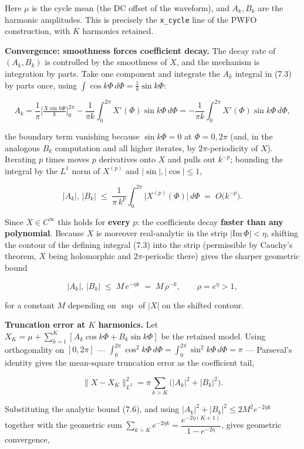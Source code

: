 \documentclass[
  11pt,
]{article}
\providecommand{\lt}{<}
\providecommand{\gt}{>}
\begin{document}
Here \(\mu\) is the cycle mean (the DC offset of the waveform), and
\(A_k,B_k\) are the harmonic amplitudes. This is precisely the
\texttt{x\_cycle} line of the PWFO construction, with \(K\) harmonics
retained.

\textbf{Convergence: smoothness forces coefficient decay.} The decay
rate of \((A_k,B_k)\) is controlled by the smoothness of \(X\), and the
mechanism is integration by parts. Take one component and integrate the
\(A_k\) integral in (7.3) by parts once, using
\(\int\cos k\Phi\,d\Phi=\tfrac{1}{k}\sin k\Phi\):

\[
A_k=\frac{1}{\pi}\Big[\tfrac{X\sin k\Phi}{k}\Big]_0^{2\pi}-\frac{1}{\pi k}\int_0^{2\pi} X'(\Phi)\sin k\Phi\,d\Phi
=-\frac{1}{\pi k}\int_0^{2\pi} X'(\Phi)\sin k\Phi\,d\Phi, \tag{7.4}
\]

the boundary term vanishing because \(\sin k\Phi=0\) at \(\Phi=0,2\pi\)
(and, in the analogous \(B_k\) computation and all higher iterates, by
\(2\pi\)-periodicity of \(X\)). Iterating \(p\) times moves \(p\)
derivatives onto \(X\) and pulls out \(k^{-p}\); bounding the integral
by the \(L^1\) norm of \(X^{(p)}\) and \(|\sin|,|\cos|\le1\),

\[
|A_k|,\,|B_k|\;\le\;\frac{1}{\pi\,k^{p}}\int_0^{2\pi}\big|X^{(p)}(\Phi)\big|\,d\Phi\;=\;O\!\big(k^{-p}\big). \tag{7.5}
\]

Since \(X\in C^\infty\) this holds for \textbf{every} \(p\): the
coefficients decay \textbf{faster than any polynomial}. Because \(X\) is
moreover real-analytic in the strip \(|\mathrm{Im}\,\Phi|\lt \eta\),
shifting the contour of the defining integral (7.3) into the strip
(permissible by Cauchy's theorem, \(X\) being holomorphic and
\(2\pi\)-periodic there) gives the sharper geometric bound

\[
|A_k|,\,|B_k|\;\le\;M\,e^{-\eta k}\;=\;M\,\rho^{-k},\qquad \rho=e^{\eta}\gt 1, \tag{7.6}
\]

for a constant \(M\) depending on \(\sup\) of \(|X|\) on the shifted
contour.

\textbf{Truncation error at \(K\) harmonics.} Let
\(X_K=\mu+\sum_{k=1}^K[A_k\cos k\Phi+B_k\sin k\Phi]\) be the retained
model. Using orthogonality on \([0,2\pi]\) ---
\(\int_0^{2\pi}\cos^2 k\Phi\,d\Phi=\int_0^{2\pi}\sin^2 k\Phi\,d\Phi=\pi\)
--- Parseval's identity gives the mean-square truncation error as the
coefficient tail,

\[
\|X-X_K\|_{L^2}^2=\pi\sum_{k\gt K}\big(|A_k|^2+|B_k|^2\big). \tag{7.7}
\]

Substituting the analytic bound (7.6), and using
\(|A_k|^2+|B_k|^2\le 2M^2 e^{-2\eta k}\) together with the geometric sum
\(\sum_{k\gt K}e^{-2\eta k}=\dfrac{e^{-2\eta(K+1)}}{1-e^{-2\eta}}\),
gives geometric convergence,
\end{document}
